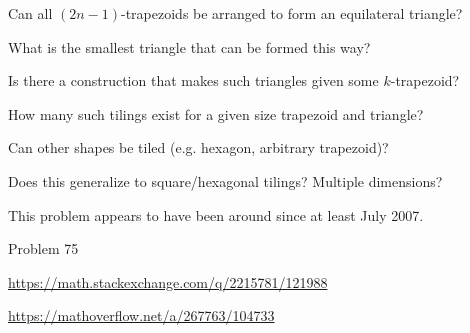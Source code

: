 \documentclass{article}
\begin{document}
\begin{question}
  Can all $(2n-1)$-trapezoids be arranged to form an equilateral triangle?
\end{question}

\begin{related}
  \item What is the smallest triangle that can be formed this way?
  \item Is there a construction that makes such triangles given some $k$-trapezoid?
  \item How many such tilings exist for a given size trapezoid and triangle?
  \item Can other shapes be tiled (e.g. hexagon, arbitrary trapezoid)?
  \item Does this generalize to square/hexagonal tilings? Multiple dimensions?
\end{related}

\begin{note}
  This problem appears to have been around since at least July 2007.
\end{note}

\begin{references}
  \item Problem 75
  \item \url{https://math.stackexchange.com/q/2215781/121988}
  \item \url{https://mathoverflow.net/a/267763/104733}
\end{references}
\end{document}
